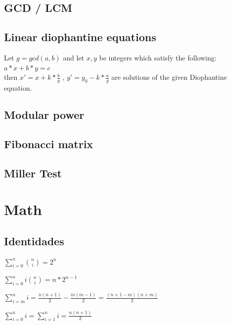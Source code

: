 \subsection{GCD / LCM}
\subsection{Linear diophantine equations}
Let $g=gcd(a,b)$ and let $x, y$ be integers which satisfy the following: $a*x+b*y=c$\\
then $x'=x+k*\frac{b}{g}$ , $y'=y_0-k*\frac{a}{g}$
are solutions of the given Diophantine equation.
\subsection{Modular power}
\subsection{Fibonacci matrix}
\subsection{Miller Test}


\section{Math}%
\subsection{Identidades}

$\sum_{i=0}^n\binom{n}{i}=2^n$

$\sum_{i=0}^n i\binom{n}{i}=n*2^{n-1}$

$\sum_{i=m}^n i = \frac{n(n+1)}{2} - \frac{m(m-1)}{2} = \frac{(n+1-m)(n+m)}{2}$

$\sum_{i=0}^n i = \sum_{i=1}^n i = \frac{n(n+1)}{2}$

